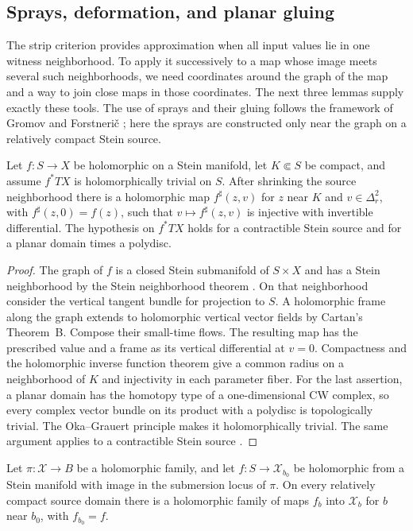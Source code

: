 \subsection{Sprays, deformation, and planar gluing}

The strip criterion provides approximation when all input values lie
in one witness neighborhood. To apply it successively to a map whose
image meets several such neighborhoods, we need coordinates around
the graph of the map and a way to join close maps in those coordinates.
The next three lemmas supply exactly these tools. The use of sprays
and their gluing follows the framework of Gromov \cite{GromovOka}
and Forstneri\v c \cite{Forstneric}; here the sprays are constructed
only near the graph on a relatively compact Stein source.

\begin{lemma}\label{loc:spray}
Let $f:S\to X$ be holomorphic on a Stein manifold, let
$K\Subset S$ be compact, and assume $f^*TX$ is holomorphically
trivial on $S$. After shrinking the source neighborhood there
is a holomorphic map $f^\sharp(z,v)$ for $z$ near $K$ and
$v\in\Delta_r^2$, with $f^\sharp(z,0)=f(z)$, such that
$v\mapsto f^\sharp(z,v)$ is injective with invertible differential.
The hypothesis on $f^*TX$ holds for a contractible Stein source
and for a planar domain times a polydisc.
\end{lemma}

\begin{proof}
The graph of $f$ is a closed Stein submanifold of $S\times X$ and
has a Stein neighborhood by the Stein neighborhood theorem
\cite{Siu}. On that neighborhood consider the vertical tangent
bundle for projection to $S$. A holomorphic frame along the graph
extends to holomorphic vertical vector fields by Cartan's
Theorem~B. Compose their small-time flows. The resulting map has
the prescribed value and a frame as its vertical differential
at $v=0$. Compactness and the holomorphic inverse function theorem
give a common radius on a neighborhood of $K$ and injectivity
in each parameter fiber.
For the last assertion, a planar domain has the homotopy type of
a one-dimensional CW complex, so every complex vector bundle on
its product with a polydisc is topologically trivial. The
Oka--Grauert principle makes it holomorphically trivial.
The same argument applies to a contractible Stein source
\cite{Forstneric}.
\end{proof}

\begin{lemma}
\label{loc:deformation}
Let $\pi:\mathcal X\to B$ be a holomorphic family, and let
$f:S\to\mathcal X_{b_0}$ be holomorphic from a Stein manifold
with image in the submersion locus of $\pi$. On every relatively
compact source domain there is a holomorphic family of maps
$f_b$ into $\mathcal X_b$ for $b$ near $b_0$, with $f_{b_0}=f$.
\end{lemma}


